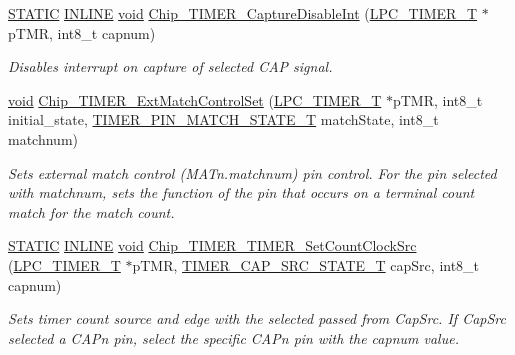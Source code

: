 \begin{DoxyCompactItemize}
\hyperlink{group__LPC__Types__Public__Macros_ga10b2d890d871e1489bb02b7e70d9bdfb}{S\-T\-A\-T\-I\-C} \hyperlink{group__LPC__Types__Public__Types_ga2eb6f9e0395b47b8d5e3eeae4fe0c116}{I\-N\-L\-I\-N\-E} \hyperlink{Paradigm_2Tern__EE_2small_2portmacro_8h_a14d32f8130d3c0b212cfc751730b5b49}{void} \hyperlink{group__TIMER__17XX__40XX_ga75d24b5365354b481b285c7c718f3791}{Chip\-\_\-\-T\-I\-M\-E\-R\-\_\-\-Capture\-Disable\-Int} (\hyperlink{structLPC__TIMER__T}{L\-P\-C\-\_\-\-T\-I\-M\-E\-R\-\_\-\-T} $\ast$p\-T\-M\-R, int8\-\_\-t capnum)
\begin{DoxyCompactList}\small\item\em Disables interrupt on capture of selected C\-A\-P signal. \end{DoxyCompactList}\item 
\hyperlink{Paradigm_2Tern__EE_2small_2portmacro_8h_a14d32f8130d3c0b212cfc751730b5b49}{void} \hyperlink{group__TIMER__17XX__40XX_gaf58d175fd6011349b7331055422b9e28}{Chip\-\_\-\-T\-I\-M\-E\-R\-\_\-\-Ext\-Match\-Control\-Set} (\hyperlink{structLPC__TIMER__T}{L\-P\-C\-\_\-\-T\-I\-M\-E\-R\-\_\-\-T} $\ast$p\-T\-M\-R, int8\-\_\-t initial\-\_\-state, \hyperlink{group__TIMER__17XX__40XX_ga15be0f559655d587ad466689f639ab72}{T\-I\-M\-E\-R\-\_\-\-P\-I\-N\-\_\-\-M\-A\-T\-C\-H\-\_\-\-S\-T\-A\-T\-E\-\_\-\-T} match\-State, int8\-\_\-t matchnum)
\begin{DoxyCompactList}\small\item\em Sets external match control (M\-A\-Tn.\-matchnum) pin control. For the pin selected with matchnum, sets the function of the pin that occurs on a terminal count match for the match count. \end{DoxyCompactList}\item 
\hyperlink{group__LPC__Types__Public__Macros_ga10b2d890d871e1489bb02b7e70d9bdfb}{S\-T\-A\-T\-I\-C} \hyperlink{group__LPC__Types__Public__Types_ga2eb6f9e0395b47b8d5e3eeae4fe0c116}{I\-N\-L\-I\-N\-E} \hyperlink{Paradigm_2Tern__EE_2small_2portmacro_8h_a14d32f8130d3c0b212cfc751730b5b49}{void} \hyperlink{group__TIMER__17XX__40XX_ga676ac53fdb5dd31f0288ea5c5023709d}{Chip\-\_\-\-T\-I\-M\-E\-R\-\_\-\-T\-I\-M\-E\-R\-\_\-\-Set\-Count\-Clock\-Src} (\hyperlink{structLPC__TIMER__T}{L\-P\-C\-\_\-\-T\-I\-M\-E\-R\-\_\-\-T} $\ast$p\-T\-M\-R, \hyperlink{group__TIMER__17XX__40XX_ga3f9e5a3ea9ebb982339b786ff7946408}{T\-I\-M\-E\-R\-\_\-\-C\-A\-P\-\_\-\-S\-R\-C\-\_\-\-S\-T\-A\-T\-E\-\_\-\-T} cap\-Src, int8\-\_\-t capnum)
\begin{DoxyCompactList}\small\item\em Sets timer count source and edge with the selected passed from Cap\-Src. If Cap\-Src selected a C\-A\-Pn pin, select the specific C\-A\-Pn pin with the capnum value. \end{DoxyCompactList}\end{DoxyCompactItemize}



